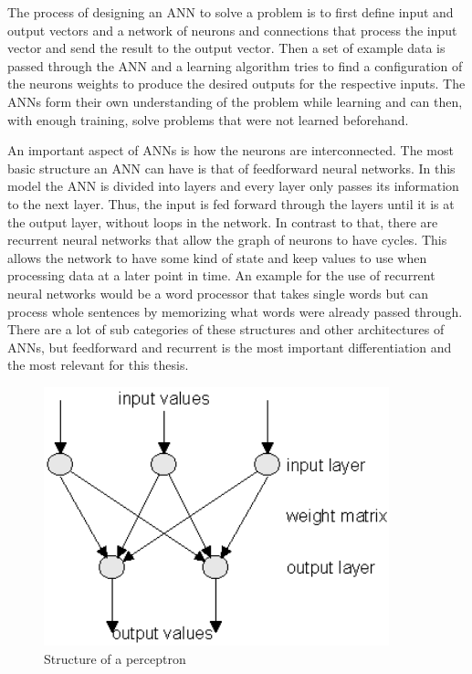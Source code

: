 The process of designing an ANN to solve a problem is to first define input and output vectors and a network of neurons and connections that process the input vector and send the result to the output vector. Then a set of example data is passed through the ANN and a learning algorithm tries to find a configuration of the neurons weights to produce the desired outputs for the respective inputs. The ANNs form their own understanding of the problem while learning and can then, with enough training, solve problems that were not learned beforehand.

An important aspect of ANNs is how the neurons are interconnected. The most basic structure an ANN can have is that of feedforward neural networks. In this model the ANN is divided into layers and every layer only passes its information to the next layer. Thus, the input is fed forward through the layers until it is at the output layer, without loops in the network. In contrast to that, there are recurrent neural networks that allow the graph of neurons to have cycles. This allows the network to have some kind of state and keep values to use when processing data at a later point in time. An example for the use of recurrent neural networks would be a word processor that takes single words but can process whole sentences by memorizing what words were already passed through. \cite{nnsAndPatternRecog} There are a lot of sub categories of these structures and other architectures of ANNs, but feedforward and recurrent is the most important differentiation and the most relevant for this thesis.\cite{introToNNs}

\begin{figure}[ht]
	\centering
  \includegraphics[width=10cm]{figures/perceptron}
	\caption[Structure of a perceptron]{Structure of a perceptron \protect\footnotemark}
	\label{perceptron}
\end{figure}

